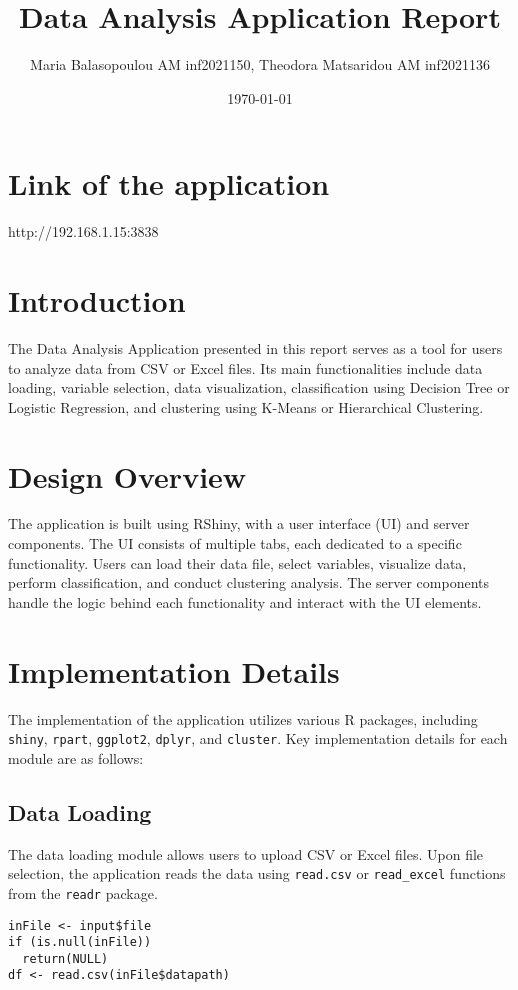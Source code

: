 \documentclass{article}
\title{Data Analysis Application Report}
\author{Maria Balasopoulou AM inf2021150, Theodora Matsaridou AM inf2021136}
\date{\today}
\begin{document}
\maketitle

\section{Link of the application}
http://192.168.1.15:3838 

\section{Introduction}
The Data Analysis Application presented in this report serves as a tool for users to analyze data from CSV or Excel files. Its main functionalities include data loading, variable selection, data visualization, classification using Decision Tree or Logistic Regression, and clustering using K-Means or Hierarchical Clustering.

\section{Design Overview}
The application is built using RShiny, with a user interface (UI) and server components. The UI consists of multiple tabs, each dedicated to a specific functionality. Users can load their data file, select variables, visualize data, perform classification, and conduct clustering analysis. The server components handle the logic behind each functionality and interact with the UI elements.

\section{Implementation Details}
The implementation of the application utilizes various R packages, including \texttt{shiny}, \texttt{rpart}, \texttt{ggplot2}, \texttt{dplyr}, and \texttt{cluster}. Key implementation details for each module are as follows:

\subsection{Data Loading}
The data loading module allows users to upload CSV or Excel files. Upon file selection, the application reads the data using \texttt{read.csv} or \texttt{read\_excel} functions from the \texttt{readr} package.

\begin{verbatim}
inFile <- input$file
if (is.null(inFile))
  return(NULL)
df <- read.csv(inFile$datapath)
\end{verbatim}
\end{document}
